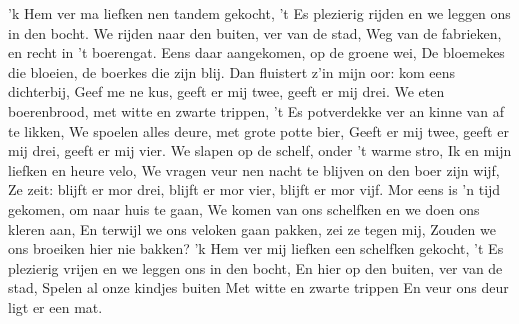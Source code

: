 \beginverse*
'k Hem ver ma liefken nen tandem gekocht,
't Es plezierig rijden en we leggen ons in den bocht. 
We rijden naar den buiten, ver van de stad,
Weg van de fabrieken, en recht in 't boerengat.
\endverse
\beginverse*
Eens daar aangekomen, op de groene wei,
De bloemekes die bloeien, de boerkes die zijn blij.
Dan fluistert z’in mijn oor: kom eens dichterbij,
Geef me ne kus, geeft er mij twee, geeft er mij drei. 
\endverse
\beginverse*
We eten boerenbrood, met witte en zwarte trippen,
't Es potverdekke ver an kinne van af te likken,
We spoelen alles deure, met grote potte bier,
Geeft er mij twee, geeft er mij drei, geeft er mij vier. 
\endverse
\beginverse*
We slapen op de schelf, onder 't warme stro,
Ik en mijn liefken en heure velo,
We vragen veur nen nacht te blijven on den boer zijn wijf,
Ze zeit: blijft er mor drei, blijft er mor vier, blijft er mor vijf. 
\endverse
\beginverse*
Mor eens is 'n tijd gekomen, om naar huis te gaan,
We komen van ons schelfken en we doen ons kleren aan,
En terwijl we ons veloken gaan pakken, zei ze tegen mij,
Zouden we ons broeiken hier nie bakken?
\endverse
\beginverse*
'k Hem ver mij liefken een schelfken gekocht,
't Es plezierig vrijen en we leggen ons in den bocht,
En hier op den buiten, ver van de stad,
Spelen al onze kindjes buiten 
Met witte en zwarte trippen  
En veur ons deur ligt er een mat. 
\endverse
\endsong